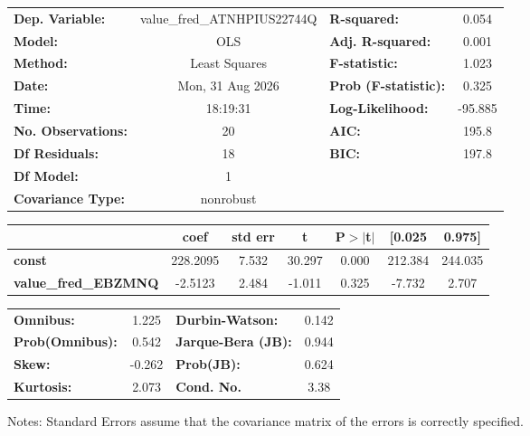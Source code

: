 \begin{center}
\begin{tabular}{lclc}
\toprule
\textbf{Dep. Variable:}      & value\_fred\_ATNHPIUS22744Q & \textbf{  R-squared:         } &     0.054   \\
\textbf{Model:}              &             OLS             & \textbf{  Adj. R-squared:    } &     0.001   \\
\textbf{Method:}             &        Least Squares        & \textbf{  F-statistic:       } &     1.023   \\
\textbf{Date:}               &       Mon, 31 Aug 2026      & \textbf{  Prob (F-statistic):} &    0.325    \\
\textbf{Time:}               &           18:19:31          & \textbf{  Log-Likelihood:    } &   -95.885   \\
\textbf{No. Observations:}   &                20           & \textbf{  AIC:               } &     195.8   \\
\textbf{Df Residuals:}       &                18           & \textbf{  BIC:               } &     197.8   \\
\textbf{Df Model:}           &                 1           & \textbf{                     } &             \\
\textbf{Covariance Type:}    &          nonrobust          & \textbf{                     } &             \\
\bottomrule
\end{tabular}
\begin{tabular}{lcccccc}
                             & \textbf{coef} & \textbf{std err} & \textbf{t} & \textbf{P$> |$t$|$} & \textbf{[0.025} & \textbf{0.975]}  \\
\midrule
\textbf{const}               &     228.2095  &        7.532     &    30.297  &         0.000        &      212.384    &      244.035     \\
\textbf{value\_fred\_EBZMNQ} &      -2.5123  &        2.484     &    -1.011  &         0.325        &       -7.732    &        2.707     \\
\bottomrule
\end{tabular}
\begin{tabular}{lclc}
\textbf{Omnibus:}       &  1.225 & \textbf{  Durbin-Watson:     } &    0.142  \\
\textbf{Prob(Omnibus):} &  0.542 & \textbf{  Jarque-Bera (JB):  } &    0.944  \\
\textbf{Skew:}          & -0.262 & \textbf{  Prob(JB):          } &    0.624  \\
\textbf{Kurtosis:}      &  2.073 & \textbf{  Cond. No.          } &     3.38  \\
\bottomrule
\end{tabular}
\end{center}

Notes: \newline
 [1] Standard Errors assume that the covariance matrix of the errors is correctly specified.